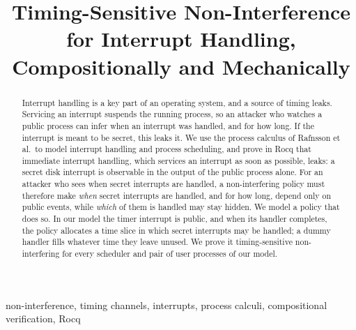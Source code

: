 \documentclass[conference]{IEEEtran}
\newif\ifanonymous
\theoremstyle{definition}
\begin{document}
\title{Timing-Sensitive Non-Interference\\for Interrupt Handling,\\
  Compositionally and Mechanically}

\ifanonymous
\author{\IEEEauthorblockN{Anonymous submission}}
\else
\author{
\and
{}
}
\fi

\maketitle
\begin{abstract}
Interrupt handling is a key part of an operating system, and a source of timing
leaks. Servicing an interrupt suspends the running process, so an attacker who
watches a public process can infer when an interrupt was handled, and for how long.
If the interrupt is meant to be secret, this leaks it. We use the process calculus of
Rafnsson et al.\ to model interrupt handling and process scheduling, and prove in
Rocq that immediate interrupt handling, which services an interrupt as soon as
possible, leaks: a secret disk interrupt is observable in the output of the public
process alone. For an attacker who sees when secret interrupts are handled, a
non-interfering policy must therefore make \emph{when} secret
interrupts are handled, and for how long, depend only on public events, while
\emph{which} of them is handled may stay hidden. We model a policy that does so. In
our model the timer interrupt is public, and when its handler completes, the policy
allocates a time slice in which secret interrupts may be handled; a dummy handler
fills whatever time they leave unused. We prove it timing-sensitive non-interfering
for every scheduler and pair of user processes of our model.
\end{abstract}

\begin{IEEEkeywords}
non-interference, timing channels, interrupts, process calculi, compositional
verification, Rocq
\end{IEEEkeywords}









\end{document}
